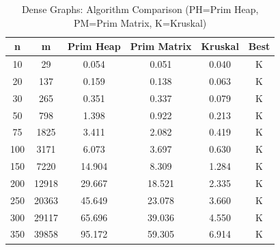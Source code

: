 \begin{table}[H]
    \centering
    \small
    \begin{tabular}{|c|c|c|c|c|c|}
    \hline
    \textbf{n} & \textbf{m} & \textbf{Prim Heap} & \textbf{Prim Matrix} & \textbf{Kruskal} & \textbf{Best} \\
    \hline
     10 &    29 &   0.054 &   0.051 &   0.040 & K \\
     20 &   137 &   0.159 &   0.138 &   0.063 & K \\
     30 &   265 &   0.351 &   0.337 &   0.079 & K \\
     50 &   798 &   1.398 &   0.922 &   0.213 & K \\
     75 &  1825 &   3.411 &   2.082 &   0.419 & K \\
    100 &  3171 &   6.073 &   3.697 &   0.630 & K \\
    150 &  7220 &  14.904 &   8.309 &   1.284 & K \\
    200 & 12918 &  29.667 &  18.521 &   2.335 & K \\
    250 & 20363 &  45.649 &  23.078 &   3.660 & K \\
    300 & 29117 &  65.696 &  39.036 &   4.550 & K \\
    350 & 39858 &  95.172 &  59.305 &   6.914 & K \\
    \hline
    \end{tabular}
    \caption{Dense Graphs: Algorithm Comparison (PH=Prim Heap, PM=Prim Matrix, K=Kruskal)}
    \label{tab:dense_comparison}
\end{table}